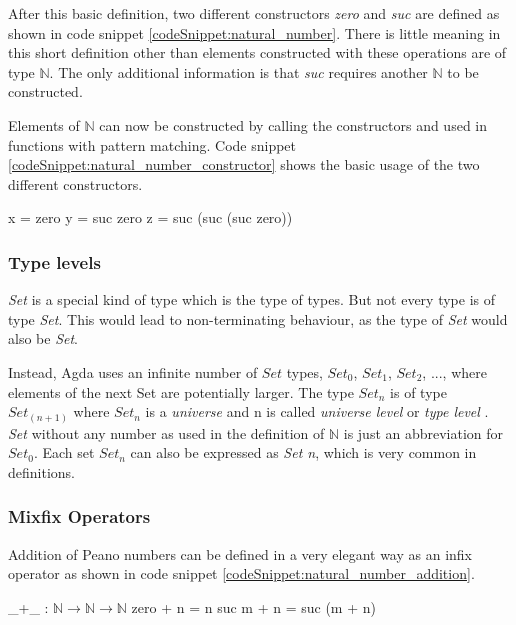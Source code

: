 After this basic definition, two different constructors \emph{zero} and \emph{suc} are defined as shown in code snippet \ref{codeSnippet:natural_number}.
There is little meaning in this short definition other than elements constructed with these operations are of type $\mathbb{N}$.
The only additional information is that \emph{suc} requires another $\mathbb{N}$ to be constructed.

Elements of $\mathbb{N}$ can now be constructed by calling the constructors and used in functions with pattern matching. 
Code snippet \ref{codeSnippet:natural_number_constructor} shows the basic usage of the two different constructors.

\begin{codesnippet}[mathescape=true, caption={Some peano numbers}, label={codeSnippet:natural_number_constructor}]
x = zero
y = suc zero
z = suc (suc (suc zero))
\end{codesnippet}

\subsubsection{Type levels}
\emph{Set} is a special kind of type which is the type of types.
But not every type is of type \emph{Set}. 
This would lead to non-terminating behaviour, as the type of \emph{Set} would also be \emph{Set}.

Instead, Agda uses an infinite number of $Set$ types, $Set_0$, $Set_1$, $Set_2$, ..., where elements of the next Set are potentially larger.
The type $Set_n$ is of type $Set_{(n+1)}$ where $Set_n$ is a \emph{universe} and n is called \emph{universe level} or \emph{type level} \cite{AgdaReadTheDocs, 10.1145/2841316}.
\emph{Set} without any number as used in the definition of $\mathbb{N}$ is just an abbreviation for $Set_0$. 
Each set $Set_n$ can also be expressed as \emph{Set n}, which is very common in definitions.

\subsubsection{Mixfix Operators}
Addition of Peano numbers can be defined in a very elegant way as an infix operator as shown in code snippet \ref{codeSnippet:natural_number_addition}.

\begin{codesnippet}[mathescape=true, caption={Peano numbers addition}, label={codeSnippet:natural_number_addition}]
_+_ : $\mathbb{N} \rightarrow \mathbb{N} \rightarrow \mathbb{N}$
zero  + n = n
suc m + n = suc (m + n)
\end{codesnippet}

